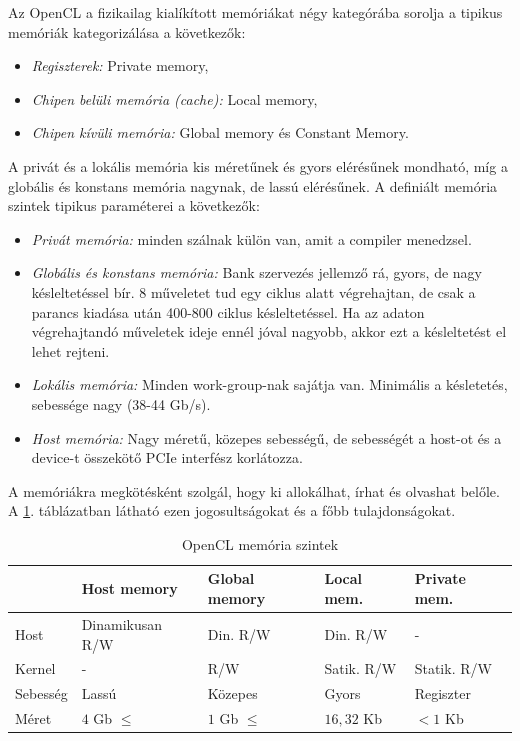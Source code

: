 	
	Az OpenCL a fizikailag kialíkított memóriákat négy kategórába sorolja a tipikus memóriák kategorizálása a következők:
	\begin{itemize}
		\item \emph{Regiszterek:} Private memory,
		\item \emph{Chipen belüli memória (cache):} Local memory,
		\item \emph{Chipen kívüli memória:} Global memory és Constant Memory.
	\end{itemize}
	A privát és a lokális memória kis méretűnek és gyors elérésűnek mondható, míg a globális és konstans memória nagynak, de
	lassú elérésűnek.
	A definiált memória szintek tipikus paraméterei a következők:
	\begin{itemize}
	 	\item \emph{Privát memória:} minden szálnak külön van, amit a compiler menedzsel.
		\item \emph{Globális és konstans memória:}  Bank szervezés jellemző rá, gyors, de nagy késleltetéssel bír. 8 műveletet
		tud egy ciklus alatt végrehajtan, de csak a parancs kiadása után 400-800 ciklus késleltetéssel. Ha az adaton végrehajtandó
		műveletek ideje ennél jóval nagyobb, akkor ezt a késleltetést el lehet rejteni. 
		\item \emph{Lokális memória:} Minden work-group-nak sajátja van. Minimális a késletetés, sebessége nagy (38-44 Gb/s).
		\item \emph{Host memória:} Nagy méretű, közepes sebességű, de sebességét a host-ot és a device-t összekötő PCIe interfész
		korlátozza.
	\end{itemize}
	A memóriákra megkötésként szolgál, hogy ki allokálhat, írhat és olvashat belőle. A \ref{table:mem}. táblázatban látható ezen
	jogosultságokat és a főbb tulajdonságokat.
	
	\begin{table}[!h]
	\renewcommand{\arraystretch}{1.3}
	\caption{OpenCL memória szintek}
	\label{table:mem}
	\centering
	\begin{tabular}{l|l|l|l|l}
			 & Host memory & Global memory & Local mem. & Private mem.\\ \hline
		Host & Dinamikusan R/W & Din. R/W &  Din. R/W & - \\
		Kernel & - & R/W & Satik. R/W & Statik. R/W\\
		Sebesség & Lassú & Közepes & Gyors & Regiszter\\
		Méret & $4$ Gb $\leq$ & $1$ Gb $\leq$ & $16,32$ Kb & $<1$ Kb
	\end{tabular}
	\end{table}

